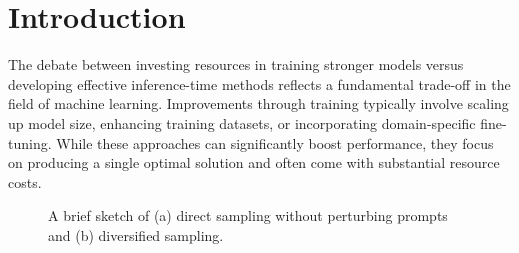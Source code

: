 \section{Introduction}
\label{sec:intro}
The debate between investing resources in training stronger models versus developing effective inference-time methods reflects a fundamental trade-off in the field of machine learning. Improvements through training typically involve scaling up model size, enhancing training datasets, or incorporating domain-specific fine-tuning. While these approaches can significantly boost performance, they focus on producing a single optimal solution and often come with substantial resource costs. 

 \begin{figure}[ht]
    \centering
    \caption{A brief sketch of (a) direct sampling without perturbing prompts and (b) diversified sampling.}
    \label{fig:introduce}
\end{figure}

